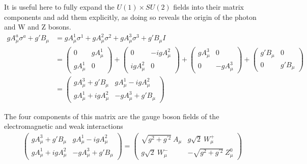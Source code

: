         It is useful here to fully expand the $U(1) \times SU(2)$ fields into their matrix components and add them explicitly,
            as doing so reveals the origin of the photon and W and Z bosons.
        \begin{equation} \begin{split}
            g A^a_{\mu} \sigma^a + g' B_{\mu} & =
                g A^1_{\mu} \sigma^1
                + g A^2_{\mu} \sigma^2
                + g A^3_{\mu} \sigma^3
                + g' B_{\mu} I \\
            & = \begin{pmatrix}
                0 & gA^1_{\mu} \\ gA^1_{\mu} & 0 \end{pmatrix}
                + \begin{pmatrix} 0 & -igA^2_{\mu} \\ igA^2_{\mu} & 0 \end{pmatrix}
                + \begin{pmatrix} gA^3_{\mu} & 0 \\ 0 & -gA^3_{\mu} \end{pmatrix}
                + \begin{pmatrix} g'B_{\mu} & 0 \\ 0 & g'B_{\mu}
            \end{pmatrix} \\
            & = \begin{pmatrix} 
                gA^3_{\mu} + g'B_{\mu} & gA^1_{\mu} - igA^2_{\mu} \\
                gA^1_{\mu} + igA^2_{\mu} & -gA^3_{\mu} + g'B_{\mu}
            \end{pmatrix}
        \end{split} \end{equation}

        The four components of this matrix are the gauge boson fields of the electromagnetic and weak interactions
        \begin{equation} \begin{split}
            \begin{pmatrix} 
                gA^3_{\mu} + g'B_{\mu} & gA^1_{\mu} - igA^2_{\mu} \\
                gA^1_{\mu} + igA^2_{\mu} & -gA^3_{\mu} + g'B_{\mu}
            \end{pmatrix} =
            \begin{pmatrix} 
                \sqrt{g^2 + g^{\prime 2}}\ A_{\mu} & g \sqrt{2}\ W^+_{\mu} \\
                g \sqrt{2}\ W^-_{\mu} & - \sqrt{g^2 + g^{\prime 2}}\ Z^0_{\mu}
            \end{pmatrix}
        \end{split} \end{equation}

